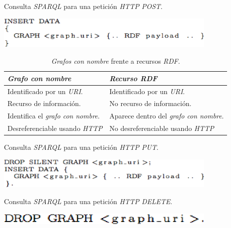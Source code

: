 \begin{table}
\vspace{2.4in}
\caption{Consulta \textit{SPARQL} para una petici\'on \textit{HTTP} \textit{POST}.}
\includegraphics[width=0.8\textwidth]{tabla7}
\label{tabla7}
\end{table}
\clearpage
\newpage


\begin{table}
\centering
\caption{\textit{Grafos con nombre} frente a recursos \textit{RDF}.}
\label{named_graph_vs_resource_uri}
\begin{center}
\begin{tabular}{|l|l|}\hline
\textbf{\textit{Grafo con nombre}} & \textbf{\textit{Recurso RDF}} \\\hline
Identificado por un \textit{URI}. & Identificado por un \textit{URI}. \\
Recurso de informaci\'on. & No recurso de informaci\'on.\\
Identifica el \textit{grafo con nombre}. & Aparece dentro del \textit{grafo con nombre}.\\
Desreferenciable usando \textit{HTTP} & No desreferenciable usando \textit{HTTP}\\\hline
\end{tabular}
\end{center}
\end{table}
\clearpage
\newpage


\begin{table}
\vspace{2.4in}
\caption{Consulta \textit{SPARQL} para una petici\'on \textit{HTTP} \textit{PUT}.}
\includegraphics[width=0.8\textwidth]{tabla8}
\label{tabla8}
\end{table}
\clearpage
\newpage


\begin{table}
\vspace{2.4in}
\caption{Consulta \textit{SPARQL} para una petici\'on \textit{HTTP} \textit{DELETE}.}
\includegraphics[width=0.8\textwidth]{tabla9}
\label{tabla9}
\end{table}
\clearpage
\newpage


